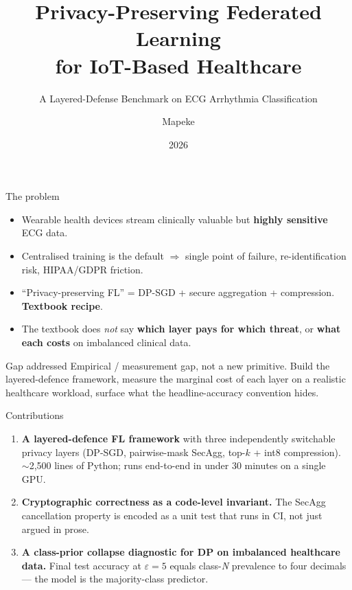 \documentclass[10pt,aspectratio=169]{beamer}
\title[Privacy-Preserving FL on ECG]{Privacy-Preserving Federated Learning\\ for IoT-Based Healthcare}
\subtitle{A Layered-Defense Benchmark on ECG Arrhythmia Classification}
\author[Mapeke]{Mapeke}
\institute[IITU]{Diploma defense \textbar{} IITU}
\date{2026}
\begin{document}
\begin{frame}
  \titlepage
\end{frame}

\begin{frame}{The problem}
  \begin{itemize}
    \item Wearable health devices stream clinically valuable but \textbf{highly sensitive} ECG data.
    \item Centralised training is the default $\Rightarrow$ single point of failure, re-identification risk, HIPAA/GDPR friction.
    \item ``Privacy-preserving FL'' = DP-SGD + secure aggregation + compression. \textbf{Textbook recipe}.
    \item The textbook does \emph{not} say \textbf{which layer pays for which threat}, or \textbf{what each costs} on imbalanced clinical data.
  \end{itemize}
  \vspace{0.5em}
  \begin{block}{Gap addressed}
    Empirical / measurement gap, not a new primitive. Build the layered-defence framework, measure the marginal cost of each layer on a realistic healthcare workload, surface what the headline-accuracy convention hides.
  \end{block}
\end{frame}

\begin{frame}{Contributions}
  \begin{enumerate}
    \item[\textbf{C1}] \textbf{A layered-defence FL framework} with three independently switchable privacy layers (DP-SGD, pairwise-mask SecAgg, top-$k$ + int8 compression). $\sim$2{,}500 lines of Python; runs end-to-end in under 30 minutes on a single GPU.
    \vspace{0.3em}
    \item[\textbf{C2}] \textbf{Cryptographic correctness as a code-level invariant.} The SecAgg cancellation property is encoded as a unit test that runs in CI, not just argued in prose.
    \vspace{0.3em}
    \item[\textbf{C3}] \textbf{A class-prior collapse diagnostic for DP on imbalanced healthcare data.} Final test accuracy at $\varepsilon = 5$ equals class-\emph{N} prevalence to four decimals --- the model is the majority-class predictor.
  \end{enumerate}
\end{frame}
\end{document}
